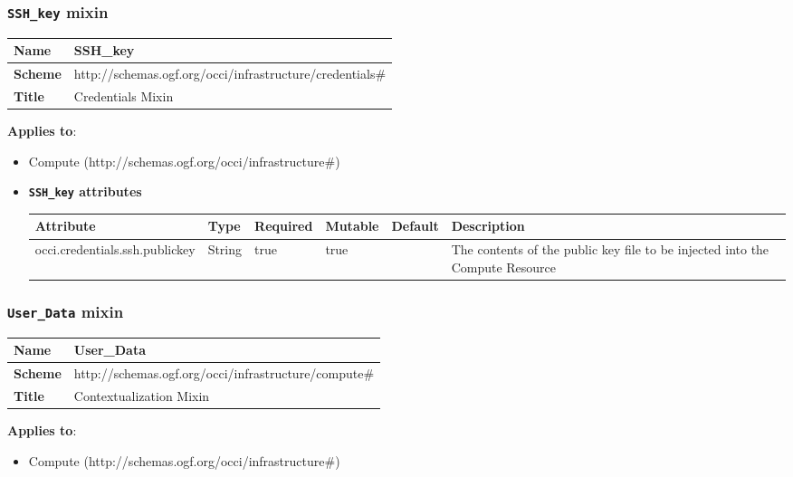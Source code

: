 \subsubsection{\texttt{SSH\_key} mixin}
\begin{center}
\begin{tabular}{|l|l|}
  \hline
  \textbf{Name} & SSH\_key \\
  \hline  
  \textbf{Scheme} & http://schemas.ogf.org/occi/infrastructure/credentials\# \\
  \hline
  \textbf{Title} & Credentials Mixin \\
  \hline
\end{tabular}
\end{center}
\textbf{Applies to}:
\begin{itemize}
	\item Compute (http://schemas.ogf.org/occi/infrastructure\#)
\end{itemize}

\begin{itemize}
\item \textbf{\texttt{SSH\_key} attributes}

\begin{tabularx}{\textwidth}{|l|l|p{1.4cm}|p{1.3cm}|l|X|}
  \hline
  \textbf{Attribute} & \textbf{Type} & \textbf{Required} & \textbf{Mutable} & \textbf{Default} & \textbf{Description} \\
  \hline  
  occi.credentials.ssh.publickey & String & true & true &  & The contents of the public key file to be injected into the Compute Resource \\
  \hline
\end{tabularx}
\end{itemize}


\subsubsection{\texttt{User\_Data} mixin}
\begin{center}
\begin{tabular}{|l|l|}
  \hline
  \textbf{Name} & User\_Data \\
  \hline  
  \textbf{Scheme} & http://schemas.ogf.org/occi/infrastructure/compute\# \\
  \hline
  \textbf{Title} & Contextualization Mixin \\
  \hline
\end{tabular}
\end{center}
\textbf{Applies to}:
\begin{itemize}
	\item Compute (http://schemas.ogf.org/occi/infrastructure\#)
\end{itemize}

